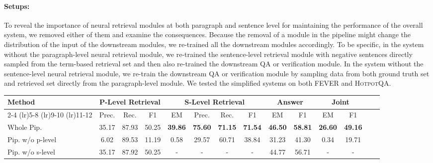 \documentclass[11pt,a4paper]{article}
\newcommand\fever{FEVER\xspace}
\newcommand\hpqa{\textsc{HotpotQA}\xspace}
\begin{document}
\paragraph{Setups:} To reveal the importance of neural retrieval modules at both paragraph and sentence level for maintaining the performance of the overall system, we removed either of them and examine the consequences. Because the removal of a module in the pipeline might change the distribution of the input of the downstream modules, we re-trained all the downstream modules accordingly. To be specific, in the system without the paragraph-level neural retrieval module, we re-trained the sentence-level retrieval module with negative sentences directly sampled from the term-based retrieval set and then also re-trained the downstream QA or verification module. In the system without the sentence-level neural retrieval module, we re-train the downstream QA or verification module by sampling data from both ground truth set and retrieved set directly from the paragraph-level module. We tested the simplified systems on both \fever and \hpqa.

\begin{table*}[t]
\centering
\begin{small}
\begin{tabular}{lccccccccccccc}
\toprule
\multirow{2}{*}{\textbf{Method}} &
\multicolumn{3}{c}{P-Level Retrieval} & \multicolumn{4}{c}{S-Level Retrieval} &
\multicolumn{2}{c}{Answer} &
\multicolumn{2}{c}{Joint} \\
\cmidrule(lr){2-4}
\cmidrule(lr){5-8}
\cmidrule(lr){9-10}
\cmidrule(lr){11-12}
 & Prec. & Rec. & F1 & EM & Prec. & Rec. & F1 & EM & F1 & EM & F1\\
\midrule
Whole Pip. & 35.17 & 87.93 & 50.25 & \textbf{39.86} & \textbf{75.60} & \textbf{71.15} & \textbf{71.54} & \textbf{46.50} & \textbf{58.81} & \textbf{26.60} & \textbf{49.16} \\
Pip. w/o p-level & 6.02 & 89.53 & 11.19 & 0.58 & 29.57 & 60.71 & 38.84 & 31.23 & 41.30 & 0.34 & 19.71 \\
Pip. w/o s-level & 35.17 & 87.92 & 50.25 & - & - & - & - & 44.77 & 56.71 & - & - \\
\bottomrule
\end{tabular}
\end{small}
\vspace{-5pt}
\caption{Ablation over the paragraph-level and sentence-level neural retrieval sub-modules on \hpqa.}
\label{tab:hotpot_p_level_ablation}
\vspace{-5pt}
\end{table*}
\end{document}
